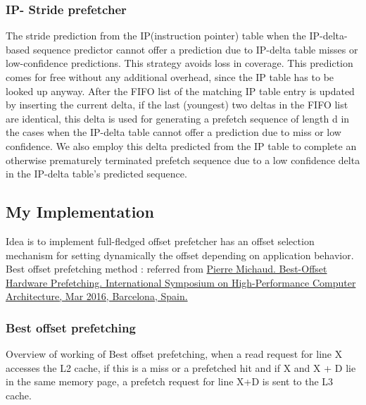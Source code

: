 \documentclass[a4paper]{article}
\begin{document}
        \subsubsection*{IP- Stride prefetcher}
        The stride prediction from the IP(instruction pointer) table when the
        IP-delta-based sequence predictor cannot offer a prediction due to
        IP-delta table misses or low-confidence predictions. This strategy
        avoids loss in coverage. This prediction comes for free without any
        additional overhead, since the IP table has to be looked up anyway.
        After the FIFO list of the matching IP table entry is updated by
        inserting the current delta, if the last (youngest) two deltas in the
        FIFO list are identical, this delta is used for generating a prefetch
        sequence of length d in the cases when the IP-delta table cannot
        offer a prediction due to miss or low confidence. We also employ
        this delta predicted from the IP table to complete an otherwise
        prematurely terminated prefetch sequence due to a low confidence
        delta in the IP-delta table’s predicted sequence.
        
    \subsection{My Implementation}
        Idea is to implement full-fledged offset prefetcher has an offset selection mechanism for setting dynamically the offset depending on application behavior.
        Best offset prefetching method : referred from \href{https://hal.inria.fr/hal-01254863}{Pierre Michaud. Best-Offset Hardware Prefetching. International Symposium on High-Performance Computer Architecture, Mar 2016, Barcelona, Spain.}
        \\ 
        
        \subsubsection*{Best offset prefetching}
            Overview of working of Best offset prefetching, when a read request for line X accesses the L2 cache, if this is a miss or a prefetched hit and if X and X + D lie in the same memory page, a prefetch request for line X+D is sent to the L3 cache.
            
\end{document}

